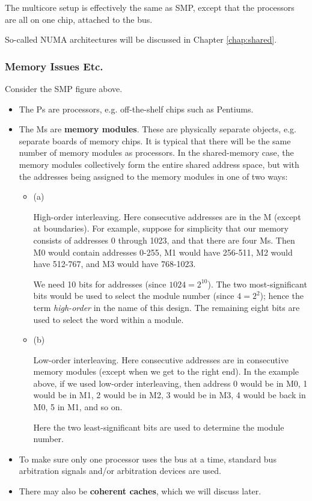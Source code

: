 The multicore setup is effectively the same as SMP, except that the
processors are all on one chip, attached to the bus.

So-called NUMA architectures will be discussed in Chapter
\ref{chap:shared}.

\subsubsection{Memory Issues Etc.}

Consider the SMP figure above.

\begin{itemize}

\item The Ps are processors, e.g. off-the-shelf chips such as Pentiums.

\item The Ms are \textbf{memory modules}. These are physically separate
objects, e.g. separate boards of memory chips.  It is typical that there
will be the same number of memory modules as processors.  In the
shared-memory case, the memory modules collectively form the entire
shared address space, but with the addresses being assigned to the
memory modules in one of two ways:

\begin{itemize}

\item (a)

High-order interleaving. Here consecutive addresses are in the
 M (except at boundaries). For example, suppose for
simplicity that our memory consists of addresses 0 through 1023, and
that there are four Ms.  Then M0 would contain addresses 0-255, M1 would
have 256-511, M2 would have 512-767, and M3 would have
768-1023.

We need 10 bits for addresses (since $1024 = 2^{10}$).  The two
most-significant bits would be used to select the module number (since
$4 = 2^2$); hence the term {\it high-order} in the name of this design.
The remaining eight bits are used to select the word within a module.

\item (b)

Low-order interleaving. Here consecutive addresses are in consecutive
memory modules (except when we get to the right end). In the example
above, if we used low-order interleaving, then address 0 would be in M0,
1 would be in M1, 2 would be in M2, 3 would be in M3, 4 would be back in
M0, 5 in M1, and so on.

Here the two least-significant bits are used to determine the module
number.

\end{itemize}

\item To make sure only one processor uses the bus at a time, standard bus
arbitration signals and/or arbitration devices are used.

\item There may also be \textbf{coherent caches}, which we will discuss later.

\end{itemize}

